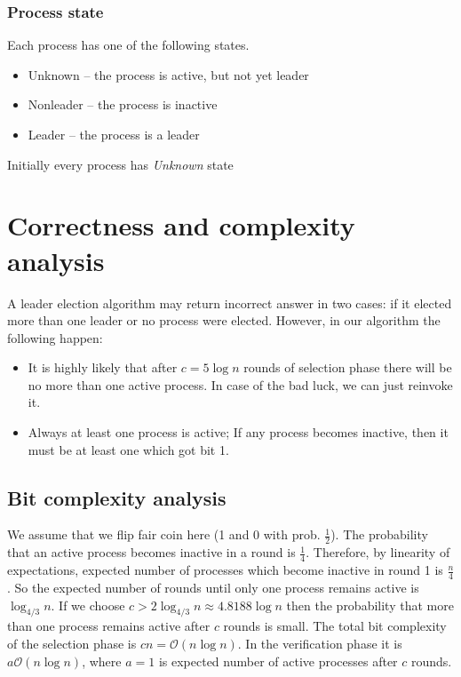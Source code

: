 \documentclass{article}
\begin{document}
\subsubsection{Process state}
Each process has one of the following states.
\begin{itemize}
    \item Unknown -- the process is active, but not yet leader
    \item Nonleader -- the process is inactive
    \item Leader -- the process is a leader
\end{itemize}
Initially every process has \textit{Unknown} state
\section{Correctness and complexity analysis}
    A leader election algorithm may return incorrect answer in two cases: if it elected more than one leader or no process were elected. However, in our algorithm the following happen:
    \begin{itemize}
        \item It is highly likely that after $c=5\log n$ rounds of selection phase there will be no more than one active process. In case of the bad luck, we can just reinvoke it.
        \item Always at least one process is active; If any process becomes inactive, then it must be at least one which got bit 1.
    \end{itemize}


\subsection{Bit complexity analysis}
    We assume that we flip fair coin here (1 and 0 with prob. $\frac{1}{2}$). The probability that an active process becomes inactive in a round is $\frac{1}{4}$. Therefore, by linearity of expectations, expected number of processes which become inactive in round 1 is $\frac{n}{4}$ . So the expected number of rounds until only one process remains active is $\log_{4/3}{n}$. If we choose $c>2\log_{4/3}{n} \approx 4.8188 \log {n}$ then the probability that more than one process remains active after $c$ rounds is small\cite{itairodeh}. The total bit complexity of the selection phase is $cn=\mathcal{O}(n\log n)$. In the verification phase it is $a\mathcal{O}(n \log n )$, where $a=1$ is expected number of active processes after $c$ rounds.
\end{document}
